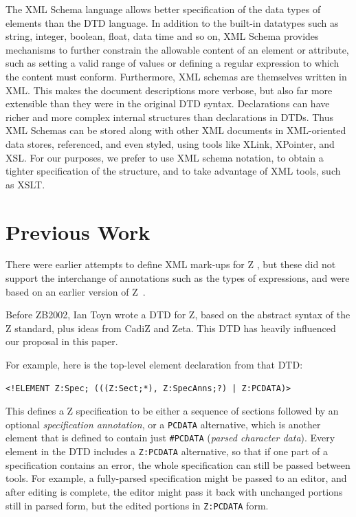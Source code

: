 \documentclass{llncs}  %
\newcommand{\AFont}[1]{\texttt{#1}}
\begin{document}
The XML Schema language allows better specification of the data types
of elements than the DTD language. In addition to the built-in
datatypes such as string, integer, boolean, float, data time and so
on, XML Schema provides mechanisms to further constrain the allowable
content of an element or attribute, such as setting a valid range of
values or defining a regular expression to which the content must
conform. Furthermore, XML schemas are themselves written in XML.  This
makes the document descriptions more verbose, but also far more
extensible than they were in the original DTD syntax. Declarations can
have richer and more complex internal structures than declarations in
DTDs. Thus XML Schemas can be stored along with other XML documents in
XML-oriented data stores, referenced, and even styled, using tools
like XLink, XPointer, and XSL. For our purposes, we prefer to use XML
schema notation, to obtain a tighter specification of the structure,
and to take advantage of XML tools, such as XSLT.


\section{Previous Work}

There were earlier attempts to define XML mark-ups for Z
\cite{Dong01,Wordsworth99,ZEVES???}, but these did not support the
interchange of annotations such as the types of expressions, and were
based on an earlier version of Z~\cite{spivey:z-notation2}.

Before ZB2002, Ian Toyn wrote a DTD for Z, based on the abstract
syntax of the Z standard, plus ideas from CadiZ and Zeta.  This
DTD has heavily influenced our proposal in this paper.

For example, here is the top-level element declaration from that DTD:
\begin{small}
\begin{verbatim}
<!ELEMENT Z:Spec; (((Z:Sect;*), Z:SpecAnns;?) | Z:PCDATA)>
\end{verbatim}
\end{small}

This defines a Z specification to be either a sequence of sections
followed by an optional \emph{specification annotation}, or a
\AFont{PCDATA} alternative, which is another element that is defined 
to contain just \verb!#PCDATA! (\textit{parsed character data}).
Every element in the DTD includes a \AFont{Z:PCDATA} alternative, so
that if one part of a specification contains an error, the whole
specification can still be passed between tools.  For example,
a fully-parsed specification might be passed to an editor, and after
editing is complete, the editor might pass it back with unchanged
portions still in parsed form, but the edited portions in \AFont{Z:PCDATA}
form. 
\end{document}
